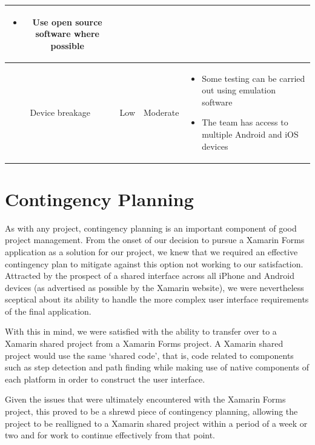 \documentclass[12pt,a4paper]{report}
\begin{document}
\begin{table}[h]
\begin{tabularx}{\textwidth}{|c|c|c| X |}
\begin{itemize}[leftmargin=*]
                \item Use open source software where possible
            \end{itemize}        
            \\ 
            \hline 
            Device breakage & Low & Moderate &
            \begin{itemize}[leftmargin=*]
                \item Some testing can be carried out using emulation software
                \item The team has access to multiple Android and iOS devices
            \end{itemize}        
            \\ 
            \hline 
        \end{tabularx}
    \end{table}

\section{Contingency Planning}

As with any project, contingency planning is an important component of good project management. From the onset of our decision to pursue a Xamarin Forms application as a solution for our project, we knew that we required an effective contingency plan to mitigate against this option not working to our satisfaction. Attracted by the prospect of a shared interface across all iPhone and Android devices (as advertised as possible by the Xamarin website), we were nevertheless sceptical about its ability to handle the more complex user interface requirements of the final application.

With this in mind, we were satisfied with the ability to transfer over to a Xamarin shared project from a Xamarin Forms project. A Xamarin shared project would use the same `shared code', that is, code related to components such as step detection and path finding while making use of native components of each platform in order to construct the user interface.

Given the issues that were ultimately encountered with the Xamarin Forms project, this proved to be a shrewd piece of contingency planning, allowing the project to be realligned to a Xamarin shared project within a period of a week or two and for work to continue effectively from that point.
\end{document}
